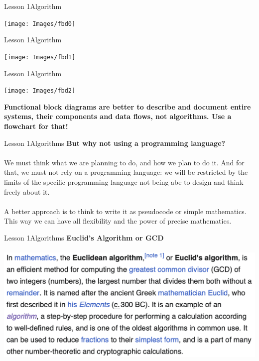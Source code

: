 \documentclass[aspectratio=1610]{beamer}
\begin{document}
\begin{frame}{Lesson 1}{Algorithm}
\begin{center}
	\texttt{[image: Images/fbd0]}
\end{center}
\end{frame}


\begin{frame}{Lesson 1}{Algorithm}
\begin{center}
	\texttt{[image: Images/fbd1]}
\end{center}
\end{frame}


\begin{frame}{Lesson 1}{Algorithm}
\begin{center}
	\texttt{[image: Images/fbd2]}
\end{center}
\end{frame}


\begin{frame}
\begin{center}
\Huge 
\textbf {Functional block diagrams are better to describe and document entire systems, their components and data flows, not algorithms. Use a flowchart for that!}
\end{center}
\end{frame}


\begin{frame}{Lesson 1}{Algorithms}
\Large
\textbf{But why not using a programming language?}\\~\\ 
We must think what we are planning to do, and how we plan to do it. And for that, we must not rely on a programming language: we will be restricted by the limits of the specific programming language not being abe to design and think freely about it.\\~\\
A better approach is to think to write it as pseudocode or simple mathematics. This way we can have all flexibility and the power of precise mathematics.
\end{frame}


\begin{frame}{Lesson 1}{Algorithms}
\Large
\textbf{Euclid's Algorithm or GCD}\\~\\ 
\includegraphics[scale=0.7]{Images/gcd}
\end{frame}
\end{document}
